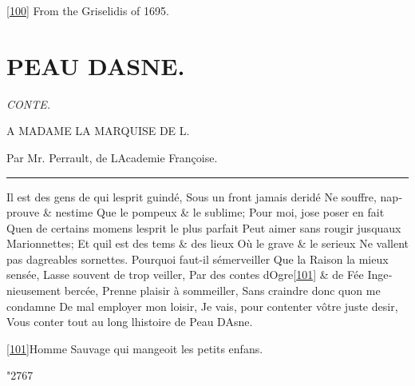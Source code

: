 \documentclass[14pt,a4paper]{memoir}
\begin{document}
\begin{otherlanguage}{french}
\protect\hypertarget{4533318093929944247_33931-h-2.htm.xhtmlux5cux23Footnote_100}{}{}\protect\hyperlink{4533318093929944247_33931-h-2.htm.xhtmlux5cux23FNanchor_100}{{{[}100{]}}}
From the Griselidis of 1695.

\chapter{PEAU D\textquotesingle ASNE.}

\begin{flushright}
\itshape
CONTE.

A MADAME LA MARQUISE DE L.

Par Mr. Perrault, de L\textquotesingle Academie Françoise.
\end{flushright}

\begin{center}\rule{0.5\linewidth}{0.5pt}\end{center}

{Il est des gens de qui l\textquotesingle esprit guindé,} {Sous un front jamais deridé} {Ne souffre, n\textquotesingle approuve \& n\textquotesingle estime} {Que le pompeux \& le sublime;} {Pour moi, j\textquotesingle ose poser en fait} {Qu\textquotesingle en de certains momens l\textquotesingle esprit le plus parfait } {Peut aimer sans rougir jusqu\textquotesingle aux Marionnettes;} {Et qu\textquotesingle il est des tems \& des lieux} {Où le grave \& le serieux} {Ne vallent pas d\textquotesingle agreables sornettes.} {Pourquoi faut-il s\textquotesingle émerveiller} {Que la Raison la mieux sensée,} {Lasse souvent de trop veiller,} {Par des contes d\textquotesingle Ogre\protect\hypertarget{4533318093929944247_33931-h-2.htm.xhtmlux5cux23FNanchor_101}{}{}\protect\hyperlink{4533318093929944247_33931-h-2.htm.xhtmlux5cux23Footnote_101}{{[}101{]}} \& de Fée} {Ingenieusement bercée,} {Prenne plaisir à sommeiller,} {Sans craindre donc qu\textquotesingle on me condamne} {De mal employer mon loisir,} {Je vais, pour contenter vôtre juste desir,} {Vous conter tout au long l\textquotesingle histoire de Peau D\textquotesingle Asne.}

\protect\hypertarget{4533318093929944247_33931-h-2.htm.xhtmlux5cux23Footnote_101}{}{}
\protect\hyperlink{4533318093929944247_33931-h-2.htm.xhtmlux5cux23FNanchor_101}{{{[}101{]}}}Homme
Sauvage qui mangeoit les petits enfans.

\vspace{1\baselineskip}
\begin{center}
    \huge \char"2767
\end{center}
\vspace{1\baselineskip}


\end{otherlanguage}
\end{document}
